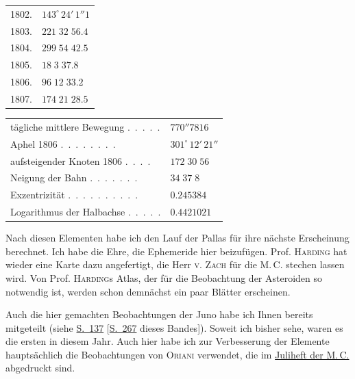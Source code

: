\begin{center}\begingroup
\fontsize{9}{11}\selectfont
\setlength{\tabcolsep}{3pt}\renewcommand{\arraystretch}{1.12}
\begin{tabular}{ll}
1802.  & $143^\circ\,24'\,1''1$ \\
1803.  & $221\;32\;56.4$ \\
1804.  & $299\;54\;42.5$ \\
1805.  & $18\;3\;37.8$ \\
1806.  & $96\;12\;33.2$ \\
1807.  & $174\;21\;28.5$ \\
\end{tabular}\endgroup\end{center}
\begin{center}\begingroup
\fontsize{9}{11}\selectfont
\setlength{\tabcolsep}{3pt}\renewcommand{\arraystretch}{1.12}
\begin{tabular}{ll}
tägliche mittlere Bewegung .\ .\ .\ .\ . & $770''7816$ \\
Aphel 1806 .\ .\ .\ .\ .\ .\ .\ . & $301^\circ\,12'\,21''$ \\
aufsteigender Knoten 1806 .\ .\ .\ . & $172\;30\;56$ \\
Neigung der Bahn .\ .\ .\ .\ .\ .\ . & $34\;37\;8$ \\
Exzentrizität .\ .\ .\ .\ .\ .\ .\ .\ .\ . & $0.245384$ \\
Logarithmus der Halbachse .\ .\ .\ .\ . & $0.4421021$ \\
\end{tabular}\endgroup\end{center}
%
\par\indent Nach diesen Elementen habe ich den Lauf der Pallas für ihre nächste Erscheinung berechnet. Ich habe die Ehre, die Ephemeride hier beizufügen. Prof. \textsc{Harding} hat wieder eine Karte dazu angefertigt, die Herr \textsc{v. Zach} für die M.\,C. stechen lassen wird. Von Prof. \textsc{Harding}s Atlas, der für die Beobachtung der Asteroiden so notwendig ist, werden schon demnächst ein paar Blätter erscheinen.

\par\indent Auch die hier gemachten Beobachtungen der Juno habe ich Ihnen bereits mitgeteilt (siehe \href{https://www.digitale-sammlungen.de/en/view/bsb10538338?page=147}{S.~137} [\hyperlink{native-272}{S.~267} dieses Bandes]). Soweit ich bisher sehe, waren es die ersten in diesem Jahr. Auch hier habe ich zur Verbesserung der Elemente hauptsächlich die Beobachtungen von \textsc{Oriani} verwendet, die im \href{https://www.digitale-sammlungen.de/en/view/bsb10538606?page=98}{Juliheft der M.\,C.} abgedruckt sind.

